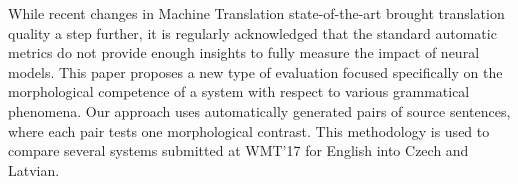 While recent changes in Machine Translation state-of-the-art brought translation quality a step further, it is regularly acknowledged that the standard automatic metrics do not provide enough insights to fully measure the impact of neural models. This paper proposes a new type of evaluation focused specifically on the morphological competence of a system with respect to various grammatical phenomena. Our approach uses automatically generated pairs of source sentences, where each pair tests one morphological contrast. This methodology is used to compare several systems submitted at WMT'17 for English into Czech and Latvian.
